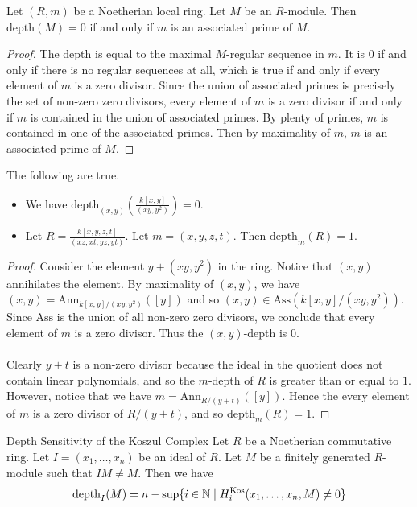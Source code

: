 \documentclass[a4paper]{article}
\begin{document}
\begin{lmm}{}{} Let $(R,m)$ be a Noetherian local ring. Let $M$ be an $R$-module. Then $\text{depth}(M)=0$ if and only if $m$ is an associated prime of $M$. 
\begin{proof}
The depth is equal to the maximal $M$-regular sequence in $m$. It is $0$ if and only if there is no regular sequences at all, which is true if and only if every element of $m$ is a zero divisor. Since the union of associated primes is precisely the set of non-zero zero divisors, every element of $m$ is a zero divisor if and only if $m$ is contained in the union of associated primes. By plenty of primes, $m$ is contained in one of the associated primes. Then by maximality of $m$, $m$ is an associated prime of $M$. 
\end{proof}
\end{lmm}

\begin{eg}{} The following are true. 
\begin{itemize}
\item We have $\text{depth}_{(x,y)}\left(\frac{k[x,y]}{(xy,y^2)}\right)=0$. 
\item Let $R=\frac{k[x,y,z,t]}{(xz,xt,yz,yt)}$. Let $m=(x,y,z,t)$. Then $\text{depth}_m(R)=1$. 
\end{itemize} 
\begin{proof}
Consider the element $y+(xy,y^2)$ in the ring. Notice that $(x,y)$ annihilates the element. By maximality of $(x,y)$, we have $(x,y)=\text{Ann}_{k[x,y]/(xy,y^2)}([y])$ and so $(x,y)\in\text{Ass}(k[x,y]/(xy,y^2))$. Since $\text{Ass}$ is the union of all non-zero zero divisors, we conclude that every element of $m$ is a zero divisor. Thus the $(x,y)$-depth is $0$. \\~\\

Clearly $y+t$ is a non-zero divisor because the ideal in the quotient does not contain linear polynomials, and so the $m$-depth of $R$ is greater than or equal to $1$. However, notice that we have $m=\text{Ann}_{R/(y+t)}([y])$. Hence the every element of $m$ is a zero divisor of $R/(y+t)$, and so $\text{depth}_m(R)=1$. 
\end{proof}
\end{eg}

\begin{prp}{Depth Sensitivity of the Koszul Complex}{} Let $R$ be a Noetherian commutative ring. Let $I=(x_1,\dots,x_n)$ be an ideal of $R$. Let $M$ be a finitely generated $R$-module such that $IM\neq M$. Then we have $$\text{depth}_I(M)=n-\sup\{i\in\mathbb{N}\;|\;H_i^\text{Kos}(x_1,\dots,x_n,M)\neq 0\}$$
\end{prp}
\end{document}
